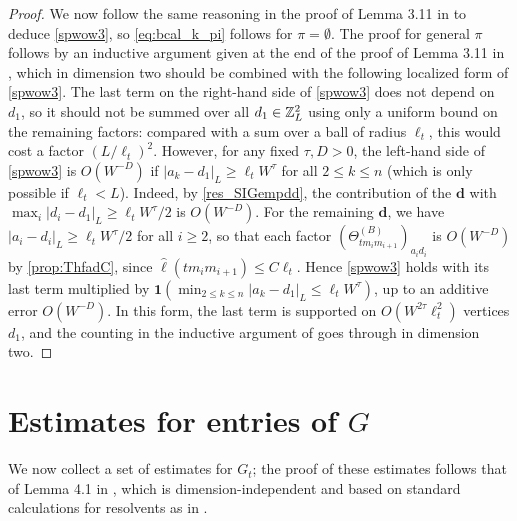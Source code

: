 \begin{proof}
We now follow the same reasoning in the proof of Lemma 3.11 in \cite{YY_25} to deduce \eqref{spwow3}, so \eqref{eq:bcal_k_pi} follows for $\pi=\emptyset$. The proof for general $\pi$ follows by an inductive argument given at the end of the proof of Lemma 3.11 in \cite{YY_25}, which in dimension two should be combined with the following localized form of \eqref{spwow3}. The last term on the right-hand side of \eqref{spwow3} does not depend on $d_{1}$, so it should not be summed over all $d_{1}\in\mathbb{Z}_{L}^{2}$ using only a uniform bound on the remaining factors: compared with a sum over a ball of radius $\ell_{t}$, this would cost a factor $(L/\ell_{t})^{2}$. However, for any fixed $\tau,D>0$, the left-hand side of \eqref{spwow3} is $O(W^{-D})$ if $|a_{k}-d_{1}|_{L}\geq\ell_{t}W^{\tau}$ for all $2\leq k\leq n$ (which is only possible if $\ell_{t}<L$). Indeed, by \eqref{res_SIGempdd}, the contribution of the $\textbf{d}$ with $\max_{i}|d_{i}-d_{1}|_{L}\geq\ell_{t}W^{\tau}/2$ is $O(W^{-D})$. For the remaining $\textbf{d}$, we have $|a_{i}-d_{i}|_{L}\geq\ell_{t}W^{\tau}/2$ for all $i\geq2$, so that each factor $(\Theta^{(B)}_{tm_{i}m_{i+1}})_{a_{i}d_{i}}$ is $O(W^{-D})$ by \eqref{prop:ThfadC}, since $\hat{\ell}(tm_{i}m_{i+1})\leq C\ell_{t}$. Hence \eqref{spwow3} holds with its last term multiplied by $\mathbf{1}(\min_{2\leq k\leq n}|a_{k}-d_{1}|_{L}\leq\ell_{t}W^{\tau})$, up to an additive error $O(W^{-D})$. In this form, the last term is supported on $O(W^{2\tau}\ell_{t}^{2})$ vertices $d_{1}$, and the counting in the inductive argument of \cite{YY_25} goes through in dimension two.
\end{proof} 





\section{Estimates for entries of \texorpdfstring{$G$}{G}}
We now collect a set of estimates for $G_{t}$; the proof of these estimates follows that of Lemma 4.1 in \cite{YY_25}, which is dimension-independent and based on standard calculations for resolvents as in \cite{erdHos2012rigidity,erdos2013delocalization}. 

